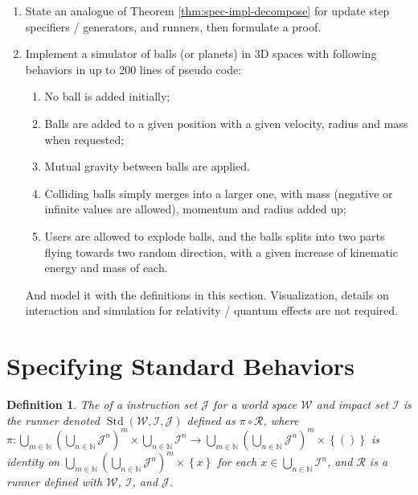 \documentclass{book}
\newtheorem{definition}{Definition}
\theoremstyle{definition}\newtheorem{mechanism}{Mechanism}
\theoremstyle{remark}\newtheorem*{remark}{Remark}
\begin{document}
\begin{enumerate}
	\item State an analogue of Theorem \ref{thm:spec-impl-decompose} for update step specifiers / generators, and runners, then formulate a proof.
	\item Implement a simulator of balls (or planets) in 3D spaces with following behaviors in up to 200 lines of pseudo code:
	
	\begin{enumerate}
		\item No ball is added initially;
		\item Balls are added to a given position with a given velocity, radius and mass when requested;
		\item Mutual gravity between balls are applied.
		\item Colliding balls simply merges into a larger one, with mass (negative or infinite values are allowed), momentum and radius added up;
		\item Users are allowed to explode balls, and the balls splits into two parts flying towards two random direction, with a given increase of kinematic energy and mass of each.
	\end{enumerate}
	
	And model it with the definitions in this section. Visualization, details on interaction and simulation for relativity / quantum effects are not required.
\end{enumerate}


\section{Specifying Standard Behaviors}

\begin{definition}
	The  of a instruction set $\mathcal J$ for a world space $\mathcal W$ and impact set $\mathcal I$ is the runner denoted $\operatorname{Std}(\mathcal W, \mathcal I, \mathcal J)$ defined as $\pi \circ \mathcal R$, where $\pi: \bigcup_{m \in \mathbb N} \left(\bigcup_{n \in \mathbb N} \mathcal J^n\right)^m \times \bigcup_{n \in \mathbb N} \mathcal I^n \to \bigcup_{m \in \mathbb N} \left(\bigcup_{n \in \mathbb N} \mathcal J^n\right)^m \times \left\{()\right\}$ is identity on $\bigcup_{m \in \mathbb N} \left(\bigcup_{n \in \mathbb N} \mathcal J^n\right)^m \times \left\{x\right\}$ for each $x\in \bigcup_{n \in \mathbb N} \mathcal I^n$, and $\mathcal R$ is a runner defined with $\mathcal W$, $\mathcal I$, and $\mathcal J$.
\end{definition}
\end{document}
